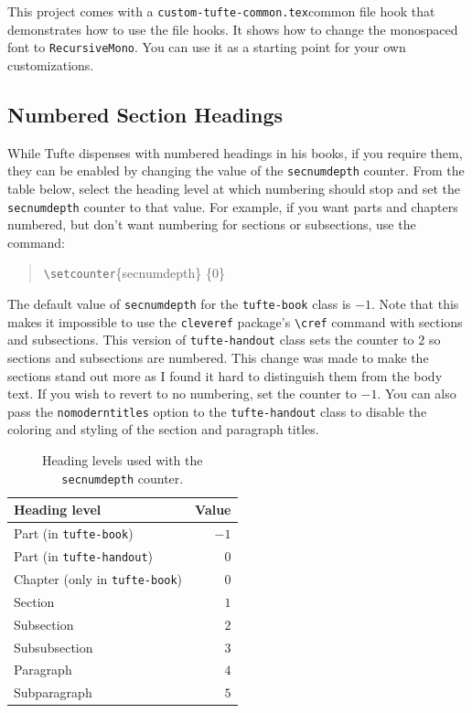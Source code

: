 \documentclass[a4paper]{tufte-handout}
\newcommand{\hlorange}[1]{\textcolor{tufte-orange}{#1}}
\newcommand{\doccmd}[1]{\hlorange{\texttt{\textbackslash#1}}}
\newcommand{\docpkg}[1]{\hlorange{\texttt{#1}}}
\newcommand{\doccls}[1]{\texttt{#1}}
\newcommand{\docclsopt}[1]{\hlorange{\texttt{#1}}}
\newcommand{\docfilehook}[1]{\texttt{#1}}
\newenvironment{docspec}
  {\begin{quotation}\ttfamily\parskip0pt\parindent0pt\ignorespaces}
  {\end{quotation}}
\begin{document}
This project comes with a \docfilehook{custom-tufte-common.tex}{common} file hook that demonstrates how to use the file hooks.
It shows how to change the monospaced font to \texttt{RecursiveMono}.
You can use it as a starting point for your own customizations.

\subsection{Numbered Section Headings}\label{sec:numbered-section-headings}
While Tufte dispenses with numbered headings in his books, if you require them, they can be enabled by changing the value of the \texttt{secnumdepth} counter. 
From the table below, select the heading level at which numbering should stop and set the \texttt{secnumdepth} counter to that value.
For example, if you want parts and chapters numbered, but don't want numbering for sections or subsections, use the command:
\begin{docspec}
  \doccmd{setcounter}\{secnumdepth\} \{0\}
\end{docspec}

The default value of \texttt{secnumdepth} for the \doccls{tufte-book} class is \(-1\).
Note that this makes it impossible to use the \docpkg{cleveref} package's \doccmd{cref} command with sections and subsections.
This version of \doccls{tufte-handout} class sets the counter to \(2\) so sections and subsections are numbered.
This change was made to make the sections stand out more as I found it hard to distinguish them from the body text.
If you wish to revert to no numbering, set the counter to \(-1\).
You can also pass the \docclsopt{nomoderntitles} option to the \doccls{tufte-handout} class to disable the coloring and styling of the section and paragraph titles.

\begin{table}
  \footnotesize
  \begin{center}
    \begin{tabular}{lr}
      \toprule
      Heading level                         & Value \\
      \midrule
      Part (in \doccls{tufte-book})         & \(-1\) \\
      Part (in \doccls{tufte-handout})      & \(0\) \\
      Chapter (only in \doccls{tufte-book}) & \(0\) \\
      Section                               & \(1\) \\
      Subsection                            & \(2\) \\
      Subsubsection                         & \(3\) \\
      Paragraph                             & \(4\) \\
      Subparagraph                          & \(5\) \\
      \bottomrule
    \end{tabular}
  \end{center}
  \caption{Heading levels used with the \texttt{secnumdepth} counter.}%
  \label{tab:secnumdepth-values}
\end{table}
\end{document}
